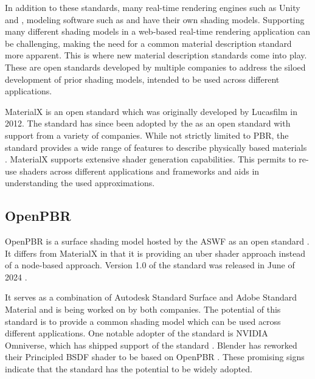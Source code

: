 In addition to these standards, many real-time rendering engines such as \gls{Unity} and , modeling software such as  and  have their own shading models. Supporting many different shading models in a web-based real-time rendering application can be challenging, making the need for a common material description standard more apparent. This is where new material description standards come into play. These are open standards developed by multiple companies to address the siloed development of prior shading models, intended to be used across different applications.

\gls{MaterialX} is an open standard which was originally developed by Lucasfilm in 2012. The standard has since been adopted by the  as an open standard with support from a variety of companies. While not strictly limited to \gls{PBR}, the standard provides a wide range of features to describe physically based materials \cite{Harrysson2019}. \gls{MaterialX} supports extensive shader generation capabilities. This permits to re-use shaders across different applications and frameworks and aids in understanding the used approximations.

\subsection{OpenPBR}

\gls{OpenPBR} is a surface shading model hosted by the \gls{ASWF} as an open standard \cite{openPBRSpec}. It differs from \gls{MaterialX} in that it is providing an \gls{uber shader} approach instead of a node-based approach. Version 1.0 of the standard was released in June of 2024 \cite{openPBR1Dot0Release}.

It serves as a combination of Autodesk Standard Surface and Adobe Standard Material and is being worked on by both companies. The potential of this standard is to provide a common shading model which can be used across different applications. One notable adopter of the standard is NVIDIA Omniverse, which has shipped support of the standard \cite{omniverseOpenPBR}. \gls{Blender} has reworked their Principled BSDF shader to be based on \gls{OpenPBR} \cite{blenderOpenPBRInspiration}. These promising signs indicate that the standard has the potential to be widely adopted.

